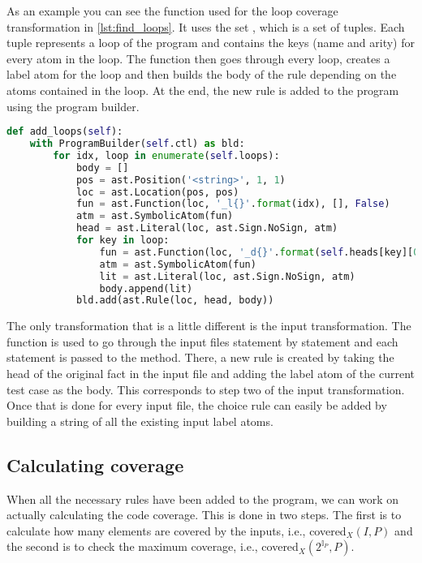 As an example you can see the function used for the loop coverage transformation in \cref{lst:find_loops}. It uses the set , which is a set of tuples. Each tuple represents a loop of the program and contains the keys (name and arity) for every atom in the loop. The function then goes through every loop, creates a label atom for the loop and then builds the body of the rule depending on the atoms contained in the loop. At the end, the new rule is added to the program using the program builder.

\begin{lstlisting}[float,caption={Function implementing the loop coverage transformation (taken from CoverageCheck\_final.py)},label=lst:find_loops, language=Python, firstnumber=71]
def add_loops(self):
    with ProgramBuilder(self.ctl) as bld:
        for idx, loop in enumerate(self.loops):
            body = []
            pos = ast.Position('<string>', 1, 1)
            loc = ast.Location(pos, pos)
            fun = ast.Function(loc, '_l{}'.format(idx), [], False)
            atm = ast.SymbolicAtom(fun)
            head = ast.Literal(loc, ast.Sign.NoSign, atm)
            for key in loop:
                fun = ast.Function(loc, '_d{}'.format(self.heads[key][0][0]), [], False)
                atm = ast.SymbolicAtom(fun)
                lit = ast.Literal(loc, ast.Sign.NoSign, atm)
                body.append(lit)
            bld.add(ast.Rule(loc, head, body))
\end{lstlisting}

The only transformation that is a little different is the input transformation. The  function is used to go through the input files statement by statement and each statement is passed to the  method. There, a new rule is created by taking the head of the original fact in the input file and adding the label atom of the current test case as the body. This corresponds to step two of the input transformation. Once that is done for every input file, the choice rule can easily be added by building a string of all the existing input label atoms.

\subsection{Calculating coverage}
\label{subsec:Computing coverage metrics for propositional programs/Implementation details/Calculating coverage}
When all the necessary rules have been added to the program, we can work on actually calculating the code coverage. This is done in two steps. The first is to calculate how many elements are covered by the inputs, i.e., covered\(_X(I, P)\) and the second is to check the maximum coverage, i.e., covered\(_X(2^{\mathbb{I}_P}, P)\). 

